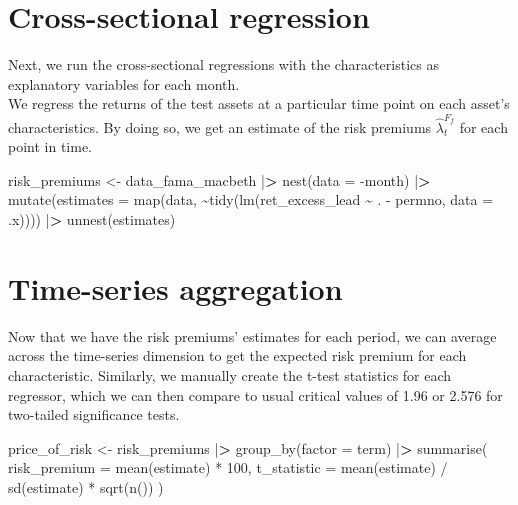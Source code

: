 \documentclass[
]{book}
\newenvironment{Shaded}{\begin{snugshade}}{\end{snugshade}}
\newcommand{\AttributeTok}[1]{\textcolor[rgb]{0.61,0.61,0.61}{#1}}
\newcommand{\DecValTok}[1]{\textcolor[rgb]{0.06,0.06,0.06}{#1}}
\newcommand{\ErrorTok}[1]{\textcolor[rgb]{0.14,0.14,0.14}{\textbf{#1}}}
\newcommand{\FunctionTok}[1]{\textcolor[rgb]{0,0,0}{#1}}
\newcommand{\NormalTok}[1]{#1}
\newcommand{\OtherTok}[1]{\textcolor[rgb]{0.37,0.37,0.37}{#1}}
\newcommand{\SpecialCharTok}[1]{\textcolor[rgb]{0,0,0}{#1}}
\begin{document}
\hypertarget{cross-sectional-regression}{%
\section{Cross-sectional regression}\label{cross-sectional-regression}}

Next, we run the cross-sectional regressions with the characteristics as explanatory variables for each month.\\
We regress the returns of the test assets at a particular time point on each asset's characteristics.
By doing so, we get an estimate of the risk premiums \(\hat\lambda^{F_f}_t\) for each point in time.

\begin{Shaded}
\begin{Highlighting}[]
\NormalTok{risk\_premiums }\OtherTok{\textless{}{-}}\NormalTok{ data\_fama\_macbeth }\SpecialCharTok{|}\ErrorTok{\textgreater{}}
  \FunctionTok{nest}\NormalTok{(}\AttributeTok{data =} \SpecialCharTok{{-}}\NormalTok{month) }\SpecialCharTok{|}\ErrorTok{\textgreater{}} 
  \FunctionTok{mutate}\NormalTok{(}\AttributeTok{estimates =} \FunctionTok{map}\NormalTok{(data, }
                         \SpecialCharTok{\textasciitilde{}}\FunctionTok{tidy}\NormalTok{(}\FunctionTok{lm}\NormalTok{(ret\_excess\_lead }\SpecialCharTok{\textasciitilde{}}\NormalTok{ . }\SpecialCharTok{{-}}\NormalTok{ permno, }\AttributeTok{data =}\NormalTok{ .x)))) }\SpecialCharTok{|}\ErrorTok{\textgreater{}} 
  \FunctionTok{unnest}\NormalTok{(estimates)}
\end{Highlighting}
\end{Shaded}

\hypertarget{time-series-aggregation}{%
\section{Time-series aggregation}\label{time-series-aggregation}}

Now that we have the risk premiums' estimates for each period, we can average across the time-series dimension to get the expected risk premium for each characteristic. Similarly, we manually create the t-test statistics for each regressor, which we can then compare to usual critical values of 1.96 or 2.576 for two-tailed significance tests.

\begin{Shaded}
\begin{Highlighting}[]
\NormalTok{price\_of\_risk }\OtherTok{\textless{}{-}}\NormalTok{ risk\_premiums }\SpecialCharTok{|}\ErrorTok{\textgreater{}}
  \FunctionTok{group\_by}\NormalTok{(}\AttributeTok{factor =}\NormalTok{ term) }\SpecialCharTok{|}\ErrorTok{\textgreater{}}
  \FunctionTok{summarise}\NormalTok{(}
    \AttributeTok{risk\_premium =} \FunctionTok{mean}\NormalTok{(estimate) }\SpecialCharTok{*} \DecValTok{100}\NormalTok{,}
    \AttributeTok{t\_statistic =} \FunctionTok{mean}\NormalTok{(estimate) }\SpecialCharTok{/} \FunctionTok{sd}\NormalTok{(estimate) }\SpecialCharTok{*} \FunctionTok{sqrt}\NormalTok{(}\FunctionTok{n}\NormalTok{())}
\NormalTok{  )}
\end{Highlighting}
\end{Shaded}
\end{document}
